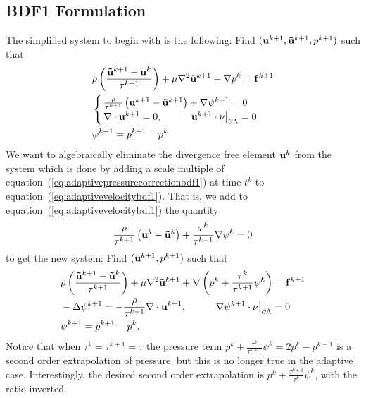 \documentclass[letterpaper]{erdc}
\begin{document}
\subsection{BDF1 Formulation}
The simplified system to begin with is the following:  Find $(\textbf{u}^{k+1},\mathbf{\tilde{u}}^{k+1},p^{k+1})$ such that
\begin{align}
  &\rho\left( \frac{\mathbf{\tilde{u}}^{k+1} - \textbf{u}^{k}}{\tau^{k+1}} \right) + \mu\nabla^2 \mathbf{\tilde{u}}^{k+1} + \nabla p^{k} = \mathbf{f}^{k+1}\label{eq:adaptivevelocitybdf1}\\
  &\begin{cases}
    \frac{\rho}{\tau^{k+1}}\left( \textbf{u}^{k+1}-\mathbf{\tilde{u}}^{k+1}\right) + \nabla\psi^{k+1} = 0\\
    \nabla\cdot\textbf{u}^{k+1} = 0, \hspace{1cm} \left.\textbf{u}^{k+1}\cdot\nu\right|_{\partial\Lambda}=0
    \end{cases}\label{eq:adaptivepressurecorrectionbdf1}\\
  & \psi^{k+1} = p^{k+1} - p^{k}
\end{align}
We want to algebraically eliminate the divergence free element $\textbf{u}^{k}$ from the system which is done by adding a scale multiple of equation~(\ref{eq:adaptivepressurecorrectionbdf1}) at time $t^{k}$ to equation~(\ref{eq:adaptivevelocitybdf1}).  That is, we add to equation~(\ref{eq:adaptivevelocitybdf1}) the quantity
\begin{equation*}
  \frac{\rho}{\tau^{k+1}}\left( \textbf{u}^{k} - \mathbf{\tilde{u}}^{k} \right) + \frac{\tau^{k}}{\tau^{k+1}}\nabla\psi^{k} = 0
\end{equation*}
to get the new system:  Find $(\mathbf{\tilde{u}}^{k+1},p^{k+1})$ such that
\begin{align}
  &\rho\left( \frac{\mathbf{\tilde{u}}^{k+1} - \mathbf{\tilde{u}}^{k}}{\tau^{k+1}} \right) + \mu\nabla^2 \mathbf{\tilde{u}}^{k+1} + \nabla\left( p^{k} + \frac{\tau^{k}}{\tau^{k+1}}\psi^{k}\right) = \mathbf{f}^{k+1}\label{eq:newadaptivevelocitybdf1}\\
  &-\Delta \psi^{k+1} = -\frac{\rho}{\tau^{k+1}}\nabla\cdot\textbf{u}^{k+1}, \hspace{1cm} \left.\nabla\psi^{k+1}\cdot\nu\right|_{\partial\Lambda} = 0 \label{eq:newadaptivepressurecorrectionbdf1}\\
  & \psi^{k+1} = p^{k+1} - p^{k}.
\end{align}
Notice that when $\tau^{k}=\tau^{k+1}=\tau$ the pressure term $p^{k} + \frac{\tau^{k}}{\tau^{k+1}}\psi^{k} = 2p^{k}-p^{k-1}$ is a second order extrapolation of pressure, but this is no longer true in the adaptive case.  Interestingly, the desired second order extrapolation is $p^{k} + \frac{\tau^{k+1}}{\tau^{k}}\psi^{k}$, with the ratio inverted.
\end{document}
